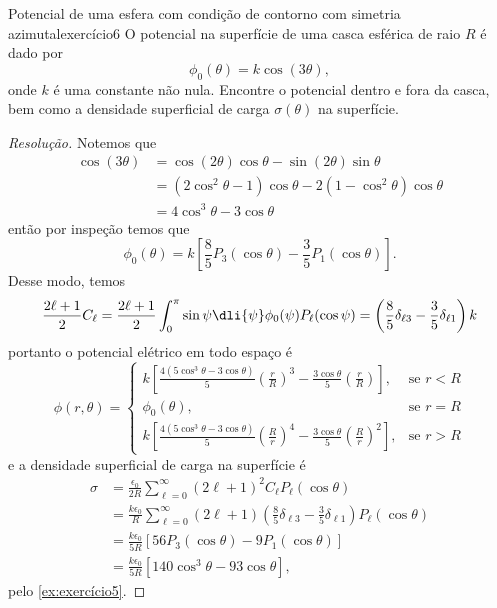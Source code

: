 \begin{exercício}{Potencial de uma esfera com condição de contorno com simetria azimutal}{exercício6}
    O potencial na superfície de uma casca esférica de raio \(R\) é dado por
    \begin{equation*}
        \phi_0(\theta) = k \cos(3\theta),
    \end{equation*}
    onde \(k\) é uma constante não nula. Encontre o potencial dentro e fora da casca, bem como a densidade superficial de carga \(\sigma(\theta)\) na superfície.
\end{exercício}
\begin{proof}[Resolução]
    Notemos que
    \begin{align*}
        \cos(3\theta) &= \cos(2\theta)\cos\theta - \sin(2\theta) \sin\theta\\&= (2\cos^2\theta - 1)\cos\theta - 2(1 - \cos^2\theta)\cos\theta \\&= 4\cos^3\theta - 3\cos\theta
    \end{align*}
    então por inspeção temos que
    \begin{equation*}
        \phi_0(\theta) = k\left[\frac85P_3(\cos\theta) - \frac35 P_1(\cos\theta)\right].
    \end{equation*}
    Desse modo, temos
    \begin{equation*}
        \frac{2 \ell + 1}{2}C_\ell = \frac{2\ell + 1}{2}\int_0^\pi \sin\psi \dli{\psi} \phi_0(\psi) P_\ell(\cos\psi) = \left(\frac{8}{5}\delta_{\ell 3} - \frac{3}{5}\delta_{\ell 1}\right)k
    \end{equation*}
    portanto o potencial elétrico em todo espaço é
    \begin{equation*}
        \phi(r, \theta) = \begin{cases}
            k\left[\frac{4(5 \cos^3\theta - 3 \cos\theta)}{5}\left(\frac{r}{R}\right)^3 - \frac{3\cos\theta}{5}\left(\frac{r}{R}\right)\right], &\text{se } r < R\\
            \phi_0(\theta), &\text{se } r = R\\
            k\left[\frac{4(5 \cos^3\theta - 3 \cos\theta)}{5}\left(\frac{R}{r}\right)^4 - \frac{3\cos\theta}{5}\left(\frac{R}{r}\right)^2\right], &\text{se } r > R
        \end{cases}
    \end{equation*}
    e a densidade superficial de carga na superfície é
    \begin{align*}
    \sigma &= \frac{\epsilon_0}{2R}\sum_{\ell = 0}^\infty (2\ell + 1)^2C_\ell P_\ell(\cos\theta)\\
           &= \frac{k\epsilon_0}{R} \sum_{\ell = 0}^\infty (2 \ell + 1) \left(\frac{8}{5}\delta_{\ell 3} - \frac{3}{5} \delta_{\ell 1}\right) P_\ell(\cos\theta)\\
           &= \frac{k \epsilon_0}{5R}\left[56 P_3(\cos \theta) - 9 P_1(\cos\theta)\right]\\
           &= \frac{k \epsilon_0}{5 R}\left[140 \cos^3\theta - 93\cos\theta\right],
    \end{align*}
    pelo \cref{ex:exercício5}.
\end{proof}
